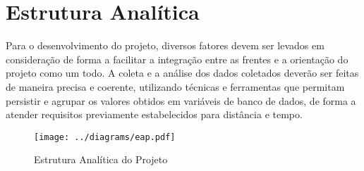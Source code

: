 \section{Estrutura Analítica}

Para o desenvolvimento do projeto, diversos fatores devem ser levados em
consideração de forma a facilitar a integração entre as frentes e a orientação
do projeto como um todo. A coleta e a análise dos dados coletados deverão ser
feitas de maneira precisa e coerente, utilizando técnicas e ferramentas que
permitam persistir e agrupar os valores obtidos em variáveis de banco de dados,
de forma a atender requisitos previamente estabelecidos para distância e tempo.

\begin{figure}[htb]
  \caption{\label{fig:eap} Estrutura Analítica do Projeto}

  \begin{center}
    \texttt{[image: ../diagrams/eap.pdf]}
  \end{center}

\end{figure}
